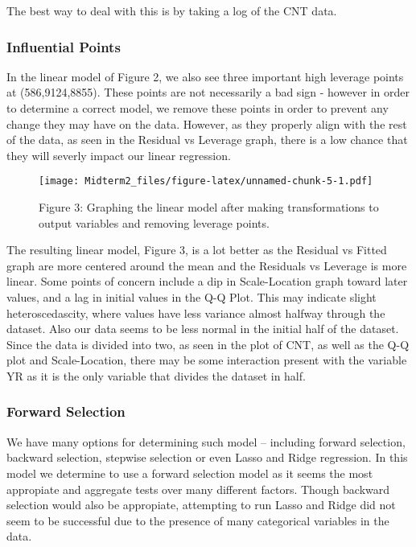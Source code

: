 \documentclass[]{article}
\begin{document}
The best way to deal with this is by taking a log of the CNT data.

\subsubsection{Influential Points}\label{influential-points}

In the linear model of Figure 2, we also see three important high
leverage points at (586,9124,8855). These points are not necessarily a
bad sign - however in order to determine a correct model, we remove
these points in order to prevent any change they may have on the data.
However, as they properly align with the rest of the data, as seen in
the Residual vs Leverage graph, there is a low chance that they will
severly impact our linear regression.

\begin{figure}
\centering
\texttt{[image: Midterm2\_files/figure-latex/unnamed-chunk-5-1.pdf]}
\caption{\label{fig:lmtrans} Figure 3: Graphing the linear model after
making transformations to output variables and removing leverage
points.}
\end{figure}

The resulting linear model, Figure 3, is a lot better as the Residual vs
Fitted graph are more centered around the mean and the Residuals vs
Leverage is more linear. Some points of concern include a dip in
Scale-Location graph toward later values, and a lag in initial values in
the Q-Q Plot. This may indicate slight heteroscedascity, where values
have less variance almost halfway through the dataset. Also our data
seems to be less normal in the initial half of the dataset. Since the
data is divided into two, as seen in the plot of CNT, as well as the Q-Q
plot and Scale-Location, there may be some interaction present with the
variable YR as it is the only variable that divides the dataset in half.

\subsubsection{Forward Selection}\label{forward-selection}

We have many options for determining such model -- including forward
selection, backward selection, stepwise selection or even Lasso and
Ridge regression. In this model we determine to use a forward selection
model as it seems the most appropiate and aggregate tests over many
different factors. Though backward selection would also be appropiate,
attempting to run Lasso and Ridge did not seem to be successful due to
the presence of many categorical variables in the data.
\end{document}
